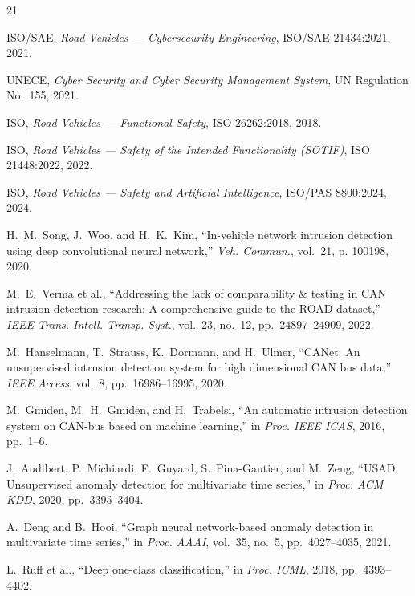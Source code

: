 \documentclass[conference]{IEEEtran}
\begin{document}
\begin{thebibliography}{21}
\fontsize{6.5pt}{7.2pt}\selectfont
\setlength{\itemsep}{0.5pt plus 0.1pt minus 0.1pt}
\setlength{\parskip}{0pt}
\setlength{\parsep}{0pt}

ISO/SAE, \textit{Road Vehicles --- Cybersecurity Engineering}, ISO/SAE 21434:2021, 2021.

UNECE, \textit{Cyber Security and Cyber Security Management System}, UN Regulation No.~155, 2021.

ISO, \textit{Road Vehicles --- Functional Safety}, ISO 26262:2018, 2018.

ISO, \textit{Road Vehicles --- Safety of the Intended Functionality (SOTIF)}, ISO 21448:2022, 2022.

ISO, \textit{Road Vehicles --- Safety and Artificial Intelligence}, ISO/PAS 8800:2024, 2024.

H.~M.~Song, J.~Woo, and H.~K.~Kim, ``In-vehicle network intrusion detection using deep convolutional neural network,'' \textit{Veh. Commun.}, vol.~21, p. 100198, 2020.

M.~E.~Verma et al., ``Addressing the lack of comparability \& testing in CAN intrusion detection research: A comprehensive guide to the ROAD dataset,'' \textit{IEEE Trans. Intell. Transp. Syst.}, vol.~23, no.~12, pp.~24897--24909, 2022.

M.~Hanselmann, T.~Strauss, K.~Dormann, and H.~Ulmer, ``CANet: An unsupervised intrusion detection system for high dimensional CAN bus data,'' \textit{IEEE Access}, vol.~8, pp.~16986--16995, 2020.

M.~Gmiden, M.~H.~Gmiden, and H.~Trabelsi, ``An automatic intrusion detection system on CAN-bus based on machine learning,'' in \textit{Proc. IEEE ICAS}, 2016, pp.~1--6.

J.~Audibert, P.~Michiardi, F.~Guyard, S.~Pina-Gautier, and M.~Zeng, ``USAD: Unsupervised anomaly detection for multivariate time series,'' in \textit{Proc. ACM KDD}, 2020, pp.~3395--3404.

A.~Deng and B.~Hooi, ``Graph neural network-based anomaly detection in multivariate time series,'' in \textit{Proc. AAAI}, vol.~35, no.~5, pp.~4027--4035, 2021.

L.~Ruff et al., ``Deep one-class classification,'' in \textit{Proc. ICML}, 2018, pp.~4393--4402.


\end{thebibliography}
\end{document}
